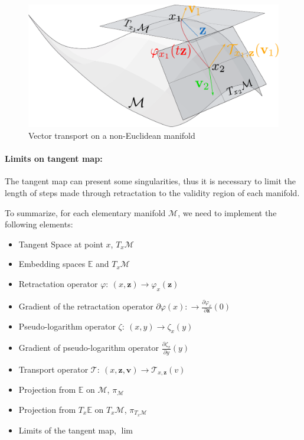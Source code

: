 \begin{figure}[htpb]
  \centering
  \includegraphics[width=0.8\linewidth]{transport.pdf}
  \caption{Vector transport on a non-Euclidean manifold}
\label{fig:transport}
\end{figure}


\paragraph{Limits on tangent map:} The tangent map can present some singularities, thus it is necessary to limit the length of steps made through retractation to the validity region of each manifold.

To summarize, for each elementary manifold $\mathcal{M}$, we need to implement the following elements:
\begin{itemize}
  \item Tangent Space at point $x$, $T_x\mathcal{M}$
  \item Embedding spaces $\mathbb{E}$ and $T_x\mathcal{M}$
  \item Retractation operator $\varphi:\ (x,\mathbf{z}) \rightarrow \varphi_x(\mathbf{z})$
  \item Gradient of the retractation operator $\partial \varphi(x):\rightarrow \frac{\partial \varphi_x}{\partial \mathbf{z}}(0)$
  \item Pseudo-logarithm operator $\zeta:\ (x,y) \rightarrow \zeta_x(y)$
  \item Gradient of pseudo-logarithm operator $\frac{\partial \zeta_x}{\partial y}(y)$
  \item Transport operator $\mathcal{T}:\ (x,\mathbf{z}, \mathbf{v})\rightarrow \mathcal{T}_{x,\mathbf{z}}(v)$
  \item Projection from $\mathbb{E}$ on $\mathcal{M}$, $\pi_\mathcal{M}$
  \item Projection from $T_x\mathbb{E}$ on $T_x\mathcal{M}$, $\pi_{T_x\mathcal{M}}$
  \item Limits of the tangent map, $\lim$
\end{itemize}

